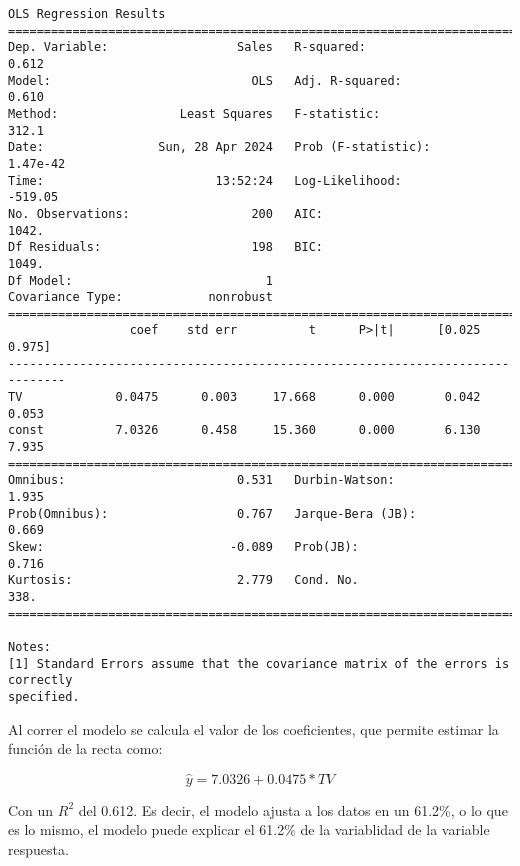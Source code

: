 \documentclass[11pt]{article}
\begin{document}
    \begin{Verbatim}[commandchars=\\\{\}]
                            OLS Regression Results
==============================================================================
Dep. Variable:                  Sales   R-squared:                       0.612
Model:                            OLS   Adj. R-squared:                  0.610
Method:                 Least Squares   F-statistic:                     312.1
Date:                Sun, 28 Apr 2024   Prob (F-statistic):           1.47e-42
Time:                        13:52:24   Log-Likelihood:                -519.05
No. Observations:                 200   AIC:                             1042.
Df Residuals:                     198   BIC:                             1049.
Df Model:                           1
Covariance Type:            nonrobust
==============================================================================
                 coef    std err          t      P>|t|      [0.025      0.975]
------------------------------------------------------------------------------
TV             0.0475      0.003     17.668      0.000       0.042       0.053
const          7.0326      0.458     15.360      0.000       6.130       7.935
==============================================================================
Omnibus:                        0.531   Durbin-Watson:                   1.935
Prob(Omnibus):                  0.767   Jarque-Bera (JB):                0.669
Skew:                          -0.089   Prob(JB):                        0.716
Kurtosis:                       2.779   Cond. No.                         338.
==============================================================================

Notes:
[1] Standard Errors assume that the covariance matrix of the errors is correctly
specified.
    \end{Verbatim}

    Al correr el modelo se calcula el valor de los coeficientes, que permite
estimar la función de la recta como:

\[\hat{y} = 7.0326 + 0.0475*TV\]

Con un \(R^2\) del 0.612. Es decir, el modelo ajusta a los datos en un
61.2\%, o lo que es lo mismo, el modelo puede explicar el 61.2\% de la
variablidad de la variable respuesta.
\end{document}
